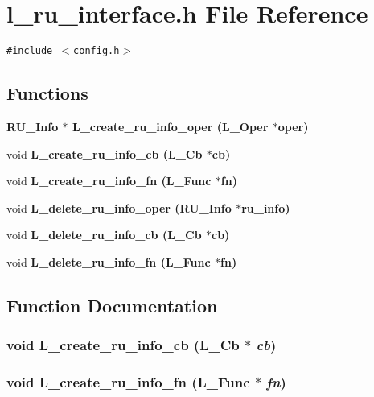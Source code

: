 \section{l\_\-ru\_\-interface.h File Reference}
\label{l__ru__interface_8h}
{\tt \#include $<$config.h$>$}\par
\subsection*{Functions}
\begin{CompactItemize}
\item 
\bf{RU\_\-Info} $\ast$ \bf{L\_\-create\_\-ru\_\-info\_\-oper} (L\_\-Oper $\ast$oper)
\item 
void \bf{L\_\-create\_\-ru\_\-info\_\-cb} (L\_\-Cb $\ast$cb)
\item 
void \bf{L\_\-create\_\-ru\_\-info\_\-fn} (L\_\-Func $\ast$fn)
\item 
void \bf{L\_\-delete\_\-ru\_\-info\_\-oper} (\bf{RU\_\-Info} $\ast$ru\_\-info)
\item 
void \bf{L\_\-delete\_\-ru\_\-info\_\-cb} (L\_\-Cb $\ast$cb)
\item 
void \bf{L\_\-delete\_\-ru\_\-info\_\-fn} (L\_\-Func $\ast$fn)
\end{CompactItemize}


\subsection{Function Documentation}
\subsubsection{\setlength{\rightskip}{0pt plus 5cm}void L\_\-create\_\-ru\_\-info\_\-cb (L\_\-Cb $\ast$ {\em cb})}\label{l__ru__interface_8h_079198444274d448dbc1619e4880f75f}


\subsubsection{\setlength{\rightskip}{0pt plus 5cm}void L\_\-create\_\-ru\_\-info\_\-fn (L\_\-Func $\ast$ {\em fn})}\label{l__ru__interface_8h_d47d6ce431312256dc8b3bc27fa25ba3}


